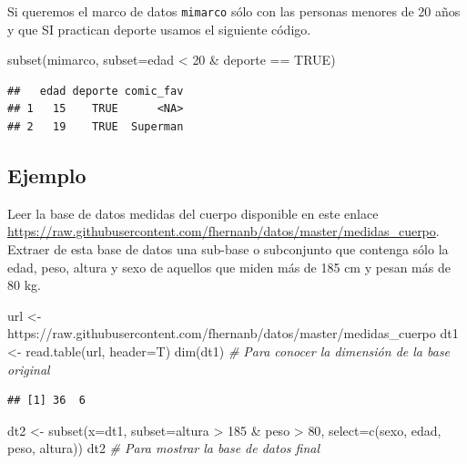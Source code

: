 \documentclass[
]{book}
\makeatletter
\newenvironment{Shaded}{\begin{snugshade}}{\end{snugshade}}
\newcommand{\AttributeTok}[1]{\textcolor[rgb]{0.77,0.63,0.00}{#1}}
\newcommand{\CommentTok}[1]{\textcolor[rgb]{0.56,0.35,0.01}{\textit{#1}}}
\newcommand{\ConstantTok}[1]{\textcolor[rgb]{0.00,0.00,0.00}{#1}}
\newcommand{\DecValTok}[1]{\textcolor[rgb]{0.00,0.00,0.81}{#1}}
\newcommand{\FunctionTok}[1]{\textcolor[rgb]{0.00,0.00,0.00}{#1}}
\newcommand{\NormalTok}[1]{#1}
\newcommand{\OtherTok}[1]{\textcolor[rgb]{0.56,0.35,0.01}{#1}}
\newcommand{\SpecialCharTok}[1]{\textcolor[rgb]{0.00,0.00,0.00}{#1}}
\newcommand{\StringTok}[1]{\textcolor[rgb]{0.31,0.60,0.02}{#1}}
\newenvironment{kframe}{%
\medskip{}
\setlength{\fboxsep}{.8em}
 \def\at@end@of@kframe{}%
 \ifinner\ifhmode%
  \def\at@end@of@kframe{\end{minipage}}%
  \begin{minipage}{\columnwidth}%
 \fi\fi%
 \def\FrameCommand##1{\hskip\@totalleftmargin \hskip-\fboxsep
 \colorbox{shadecolor}{##1}\hskip-\fboxsep
     \hskip-\linewidth \hskip-\@totalleftmargin \hskip\columnwidth}%
 \MakeFramed {\advance\hsize-\width
   \@totalleftmargin\z@ \linewidth\hsize
   \@setminipage}}%
 {\par\unskip\endMakeFramed%
 \at@end@of@kframe}
\renewenvironment{Shaded}{\begin{kframe}}{\end{kframe}}
\makeatother
\begin{document}
Si queremos el marco de datos \texttt{mimarco} sólo con las personas menores de 20 años y que SI practican deporte usamos el siguiente código.

\begin{Shaded}
\begin{Highlighting}[]
\FunctionTok{subset}\NormalTok{(mimarco, }\AttributeTok{subset=}\NormalTok{edad }\SpecialCharTok{\textless{}} \DecValTok{20} \SpecialCharTok{\&}\NormalTok{ deporte }\SpecialCharTok{==} \ConstantTok{TRUE}\NormalTok{)}
\end{Highlighting}
\end{Shaded}

\begin{verbatim}
##   edad deporte comic_fav
## 1   15    TRUE      <NA>
## 2   19    TRUE  Superman
\end{verbatim}

\hypertarget{ejemplo-4}{%
\subsection*{Ejemplo}\label{ejemplo-4}}

Leer la base de datos medidas del cuerpo disponible en este enlace \url{https://raw.githubusercontent.com/fhernanb/datos/master/medidas_cuerpo}. Extraer de esta base de datos una sub-base o subconjunto que contenga sólo la edad, peso, altura y sexo de aquellos que miden más de 185 cm y pesan más de 80 kg.

\begin{Shaded}
\begin{Highlighting}[]
\NormalTok{url }\OtherTok{\textless{}{-}} \StringTok{\textquotesingle{}https://raw.githubusercontent.com/fhernanb/datos/master/medidas\_cuerpo\textquotesingle{}}
\NormalTok{dt1 }\OtherTok{\textless{}{-}} \FunctionTok{read.table}\NormalTok{(url, }\AttributeTok{header=}\NormalTok{T)}
\FunctionTok{dim}\NormalTok{(dt1)  }\CommentTok{\# Para conocer la dimensión de la base original}
\end{Highlighting}
\end{Shaded}

\begin{verbatim}
## [1] 36  6
\end{verbatim}

\begin{Shaded}
\begin{Highlighting}[]
\NormalTok{dt2 }\OtherTok{\textless{}{-}} \FunctionTok{subset}\NormalTok{(}\AttributeTok{x=}\NormalTok{dt1, }\AttributeTok{subset=}\NormalTok{altura }\SpecialCharTok{\textgreater{}} \DecValTok{185} \SpecialCharTok{\&}\NormalTok{ peso }\SpecialCharTok{\textgreater{}} \DecValTok{80}\NormalTok{,}
              \AttributeTok{select=}\FunctionTok{c}\NormalTok{(}\StringTok{\textquotesingle{}sexo\textquotesingle{}}\NormalTok{, }\StringTok{\textquotesingle{}edad\textquotesingle{}}\NormalTok{, }\StringTok{\textquotesingle{}peso\textquotesingle{}}\NormalTok{, }\StringTok{\textquotesingle{}altura\textquotesingle{}}\NormalTok{))}
\NormalTok{dt2  }\CommentTok{\# Para mostrar la base de datos final}
\end{Highlighting}
\end{Shaded}
\end{document}
